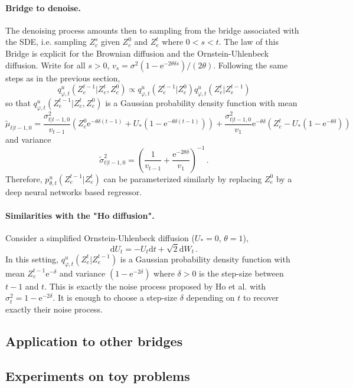 \documentclass{article}
\begin{document}
\paragraph{Bridge to denoise. }
The denoising process amounts then to sampling from the bridge associated with the SDE, i.e. sampling $Z_e^s$ given $Z_e^0$ and $Z_e^t$ where $0<s<t$. The law of this Bridge is explicit for the Brownian diffusion and the Ornstein-Uhlenbeck diffusion. Write for all $s>0$, $v_s = \sigma^2(1-\mathrm{e}^{-2\theta\delta s})/(2\theta)$.
Following the same steps as in the previous section,
$$
q^u_{\varphi,t}(Z_e^{t-1}|Z_e^{t},Z_e^{0}) \propto q^u_{\varphi,t}(Z_e^{t-1}|Z_e^{0}) q^u_{\varphi,t}(Z_e^{t}|Z_e^{t-1})
$$
so that $q^u_{\varphi,t}(Z_e^{t-1}|Z_e^{t},Z_e^{0})$ is a Gaussian probability density function with mean
$$
\tilde \mu_{t|t-1,0} = \frac{\sigma^2_{t|t-1,0}}{v_{t-1}}\left(Z_e^0\mathrm{e}^{-\theta\delta(t-1)} +U_*(1-\mathrm{e}^{-\theta\delta(t-1)})\right) + \frac{\sigma^2_{t|t-1,0}}{v_{1}}\mathrm{e}^{-\theta\delta}\left(Z_e^t - U_*(1 - \mathrm{e}^{-\theta\delta} )\right)
$$
and variance
$$
\tilde \sigma^2_{t|t-1,0} = \left(\frac{1}{v_{t-1}} + \frac{\mathrm{e}^{-2\theta\delta}}{v_1}\right)^{-1}\,.
$$
 Therefore, $p^u_{\theta,t}(Z_e^{t-1}|Z_e^t)$ can be parameterized similarly by replacing $Z_e^0$ by a deep neural networks based regressor.

\paragraph{Similarities with the "Ho diffusion". }
Consider a simplified Ornstein-Uhlenbeck diffusion ($U_* = 0$, $\theta = 1$),
$$
\mathrm{d}U_t = -U_t\mathrm{d}t + \sqrt{2}\mathrm{d}W_t\,.
$$
 In this setting, $q^u_{\varphi,t}(Z_e^{t}|Z_e^{t-1})$ is a Gaussian probability density function with mean $Z_e^{t-1}\mathrm{e}^{-\delta}$ and variance $(1-\mathrm{e}^{-2\delta})$ where $\delta>0$ is the step-size between $t-1$ and $t$. This is exactly the noise process proposed by Ho et al. with $\sigma^2_t = 1 - \mathrm{e}^{-2\delta}$. It is enough to choose a step-size $\delta$ depending on  $t$ to recover exactly their noise process.

\subsection{Application to other bridges}

\subsection{Experiments on toy problems}
\end{document}
